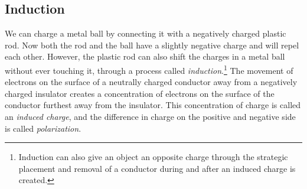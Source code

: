 \documentclass[nobib,notoc]{tufte-handout}
\begin{document}
\subsection{Induction}
We can charge a metal ball by connecting it with a negatively charged plastic rod. Now both the rod and the ball have a slightly negative charge and will repel each other. However, the plastic rod can also shift the charges in a metal ball without ever touching it, through a process called \emph{induction}.\footnote{Induction can also give an object an opposite charge through the strategic placement and removal of a conductor during and after an induced charge is created.} The movement of electrons on the surface of a neutrally charged conductor away from a negatively charged insulator creates a concentration of electrons on the surface of the conductor furthest away from the insulator. This concentration of charge is called an \emph{induced charge}, and the difference in charge on the positive and negative side is called \emph{polarization}.
\end{document}
